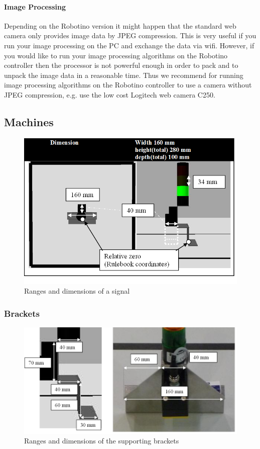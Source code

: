 \documentclass[12pt,twoside]{article}
\begin{document}
\begin{appendix}
\paragraph{Image Processing}

Depending on the Robotino version it might happen that the standard web
camera only provides image data by JPEG compression. This is very
useful if you run your image processing on the PC and exchange the data
via wifi. However, if you would like to run your image processing
algorithms on the Robotino controller then the processor is not
powerful enough in order to pack and to unpack the image data in a
reasonable time. Thus we recommend for running image processing
algorithms on the Robotino controller to use a camera without JPEG
compression, e.g. use the low cost Logitech web camera C250.

\subsection{Machines} \label{abx:sec:machine}

\begin{figure}[h]
	\centering
	\includegraphics[width=.5\textwidth]{machine_measures.png}
	\caption{Ranges and dimensions of a signal}
	\label{apx:fig:machinemeasures}
\end{figure}

\subsubsection{Brackets}

\begin{figure}[h]
	\centering
	\includegraphics[width=.5\textwidth]{bracket.png}
	\caption{Ranges and dimensions of the supporting brackets}
	\label{apx:fig:brackets}
\end{figure}


\end{appendix}
\end{document}
